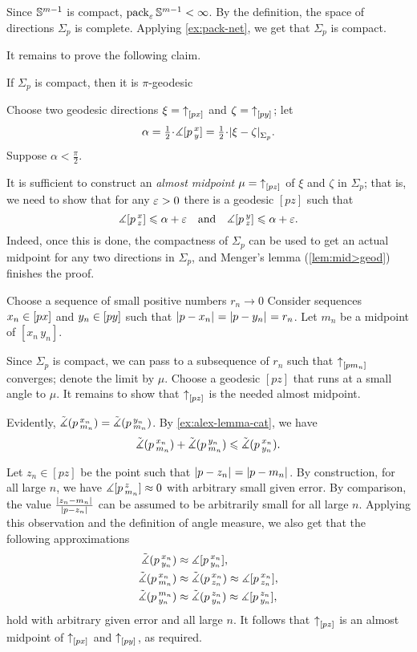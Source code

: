 Since $\mathbb{S}^{m-1}$ is compact, $\operatorname{\rm pack}\nolimits_\varepsilon\mathbb{S}^{m-1}<\infty$.
By the definition, the space of directions $\Sigma_p$ is complete. 
Applying \ref{ex:pack-net}, we get that  $\Sigma_p$ is compact.

It remains to prove the following claim.

\begin{clm}{}
If $\Sigma_p$ is compact, then it is $\pi$-geodesic
\end{clm}

Choose two geodesic directions $\xi={\uparrow}_{[{p}{x}]_{{}}}$ and $\zeta={\uparrow}_{[{p}{y}]_{{}}}$;
let 
\[\alpha\z=\tfrac12\cdot \mangle \hinge pxy=\tfrac12\cdot \dist{\xi}{\zeta}{\Sigma_p}.\]
Suppose $\alpha<\tfrac\pi2$.

It is sufficient to construct an \emph{almost midpoint} $\mu={\uparrow}_{[{p}{z}]_{{}}}$ of $\xi$ and $\zeta$ in $\Sigma_p$;
that is, we need to show that for any $\varepsilon>0$ there is a geodesic $[pz]$ such that
\[\measuredangle[p\,{}^{x}_{z}]\leqslant \alpha+\varepsilon
\quad\text{and}\quad
\measuredangle[p\,{}^{y}_{z}]\leqslant \alpha+\varepsilon.\]
Indeed, once this is done, the compactness of $\Sigma_p$ can be used to get an actual midpoint for any two directions in $\Sigma_p$, and Menger's lemma (\ref{lem:mid>geod}) finishes the proof.

Choose a sequence of small positive numbers $r_n\to0$
Consider sequences $x_n\in [px]$ and $y_n\in [py]$ such that $|{p}-{x_n}|_{}^{{}}=|{p}-{y_n}|_{}^{{}}=r_n$.
Let $m_n$ be a midpoint of $[x_n\,y_n]$.

Since $\Sigma_p$ is compact, we can pass to a subsequence of $r_n$ such that
${\uparrow}_{[{p}{m_n}]_{{}}}$ converges;
denote the limit by $\mu$.
Choose a geodesic $[pz]$ that runs at a small angle to $\mu$.
It remains to show that ${\uparrow}_{[{p}{z}]_{{}}}$ is the needed almost midpoint.

Evidently, $\tilde\measuredangle(p\,{}^{x_n}_{m_n})=\tilde\measuredangle(p\,{}^{y_n}_{m_n})$.
By \ref{ex:alex-lemma-cat}, we have
\[\tilde\measuredangle(p\,{}^{x_n}_{m_n})+\tilde\measuredangle(p\,{}^{y_n}_{m_n})\leqslant \tilde\measuredangle(p\,{}^{x_n}_{y_n}).\]

Let $z_n\in [pz]$ be the point such that $|{p}-{z_n}|_{}^{{}}=|{p}-{m_n}|_{}^{{}}$.
By construction, for all large $n$, we have $\measuredangle[p\,{}^{z}_{m_n}]\approx0$  with arbitrary small given error.
By comparison, the value $\frac{|{z_n}-{m_n}|_{}^{{}}}{|{p}-{z_n}|_{}^{{}}}$ can be assumed to be arbitrarily small for all large $n$.
Applying this observation and the definition of angle measure, we also get that the following approximations
\begin{align*}
\tilde\measuredangle(p\,{}^{x_n}_{y_n})&\approx \measuredangle[p\,{}^{x_n}_{y_n}],
\\
\tilde\measuredangle(p\,{}^{x_n}_{m_n})&\approx\tilde\measuredangle(p\,{}^{x_n}_{z_n})\approx\measuredangle[p\,{}^{x_n}_{z_n}],
\\
\tilde\measuredangle(p\,{}^{m_n}_{y_n})&\approx\tilde\measuredangle(p\,{}^{z_n}_{y_n})\approx\measuredangle[p\,{}^{z_n}_{y_n}],
\end{align*}
hold with arbitrary given error and all large $n$.
It follows that ${\uparrow}_{[{p}{z}]_{{}}}$ is an almost midpoint of ${\uparrow}_{[{p}{x}]_{{}}}$ and ${\uparrow}_{[{p}{y}]_{{}}}$, as required.
\qeds

